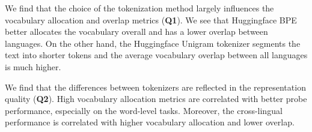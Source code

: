We find that the choice of the tokenization method largely influences the vocabulary allocation and overlap metrics (\textbf{Q1}). We see that Huggingface BPE better allocates the vocabulary overall and has a lower overlap between languages. On the other hand, the Huggingface Unigram tokenizer segments the text into shorter tokens and the average vocabulary overlap between all languages is much higher.

We find that the differences between tokenizers are reflected in the representation quality (\textbf{Q2}). High vocabulary allocation metrics are correlated with better probe performance, especially on the word-level tasks. Moreover, the cross-lingual performance is correlated with higher vocabulary allocation and lower overlap.